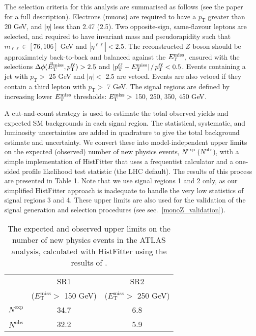 The selection criteria for this analysis are summarised as follows (see the paper for a full description). Electrons (muons) are required to have a $p_{\mathrm{T}}$ greater than 20 GeV, and $|\eta|$ less than 2.47 (2.5). Two opposite-sign, same-flavour leptons are selected, and required to have invariant mass and pseudorapidity such that $m_{\ell \ell} \in [76, 106]$ GeV and $|\eta^{\ell \ell}| < 2.5$. The reconstructed $Z$ boson should be approximately back-to-back and balanced against the $E_{\mathrm{T}}^{\mathrm{miss}}$, ensured with the selections $\Delta \phi (\vec{E}_{\mathrm{T}}^{\mathrm{miss}}, p_{\mathrm{T}}^{\ell \ell}) > 2.5$ and $| p_{\mathrm{T}}^{\ell \ell} - E_{\mathrm{T}}^{\mathrm{miss}} | \, /  \, p_{\mathrm{T}}^{\ell \ell} < 0.5$. Events containing a jet with $p_{\mathrm{T}}>$ 25 GeV and $|\eta|< $ 2.5 are vetoed. Events are also vetoed if they contain a third lepton with $p_{\mathrm{T}}>$ 7 GeV. The signal regions are defined by increasing lower $E_{\mathrm{T}}^{\mathrm{miss}}$ thresholds: $E_{\mathrm{T}}^{\mathrm{miss}} >$ 150, 250, 350, 450 GeV.



A cut-and-count strategy is used to estimate the total observed yields and expected SM backgrounds in each signal region. The statistical, systematic, and luminosity uncertainties are added in quadrature to give the total background estimate and uncertainty. We convert these into model-independent upper limits on the expected (observed) number of new physics events, $N^{\mathrm{exp}}$ ($N^{\mathrm{obs}}$), with a simple implementation of HistFitter that uses a frequentist calculator and a one-sided profile likelihood test statistic (the LHC default). The results of this process are presented in Table \ref{tab:Nlim_monoZ}. Note that we use signal regions 1 and 2 only, as our simplified HistFitter approach is inadequate to handle the very low statistics of signal regions 3 and 4. These upper limits are also used for the validation of the \monoZ signal generation and selection procedures (see sec.~\ref{monoZ_validation}).

\begin{table}
\begin{center}
\begin{tabular}{ c  c  c }
\hline
\hline
& SR1 & SR2 \T \\
& ($E_{\mathrm{T}}^{\mathrm{miss}} > $ 150 GeV) & ($E_{\mathrm{T}}^{\mathrm{miss}} > $ 250 GeV) \B \\
\hline
$N^{\mathrm{exp}}$ & 34.7 & 6.8 \T \\
$N^{\mathrm{obs}}$ & 32.2 & 5.9 \B \\
\hline
\hline
\end{tabular}
\end{center}
\label{tab:Nlim_monoZ}
\caption{The expected and observed upper limits on the number of new physics events in the ATLAS \monoZ analysis, calculated with HistFitter using the results of \cite{Aad:2014monoZlep}.}
\end{table}

